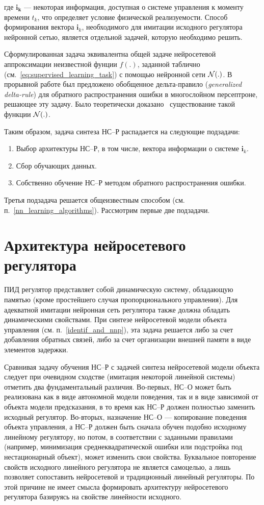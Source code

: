 \noindent где $\mathbf{i_k}$ --- некоторая информация, доступная о
системе управления к моменту времени $t_k$, что определяет условие
физической реализуемости.  Способ формирования вектора $\mathbf{i}_k$,
необходимого для имитации исходного регулятора нейронной сетью,
является отдельной задачей, которую необходимо решить.

Сформулированная задача эквивалентна общей задаче нейросетевой
аппроксимации неизвестной фунции $f(.)$, заданной таблично
(см.~\eqref{eq:supervised_learning_task}) с помощью нейронной сети
$\mathcal{N}(.)$.  В прорывной работе \cite{rumelhart86} был предложено
обобщенное дельта-правило ({\em generalized delta-rule}) для обратного
распространения ошибки в многослойном персептроне, решающее эту
задачу.  Было теоретически доказано~\cite{XXX}
существование такой функции $\mathcal{N}(.)$.

Таким образом, задача синтеза НС--Р распадается на следующие
подзадачи:
\begin{enumerate}
\item Выбор архитектуры НС--Р, в том числе, вектора информации о
  системе $\mathbf{i}_k$.
\item Сбор обучающих данных.
\item Собственно обучение НС--Р методом обратного распространения
  ошибки.
\end{enumerate}

Третья подзадача решается общеизвестным способом
(см. п.~\ref{nn_learning_algorithms}).  Рассмотрим первые две
подзадачи.

\section{Архитектура нейросетевого регулятора}

ПИД регулятор представляет собой динамическую систему, обладающую
памятью (кроме простейшего случая пропорционального управления).  Для
адекватной имитации нейронная сеть регулятора также должна обладать
динамическими свойствами.  При синтезе нейросетевой модели объекта
управления (см. п.~\ref{identif_and_nnp}), эта задача решается либо за
счет добавления обратных связей, либо за счет организации внешней
памяти в виде элементов задержки.

Сравнивая задачу обучения НС--Р с задачей синтеза нейросетевой модели
объекта следует при очевидном сходстве (имитация некоторой линейной
системы) отметить два фундаментальный различия.  Во-первых, НС--О
может быть реализована как в виде автономной модели поведения, так и в
виде зависимой от объекта модели предсказания, в то время как НС--Р
должен полностью заменить исходный регулятор.  Во-вторых, назначение
НС--О --- копирование поведения объекта управления, а НС--Р должен
быть сначала обучен подобно исходному линейному регулятору, но потом,
в соответствии с заданными правилами (например, минимизация
среднеквадратической ошибки или подстройка под нестационарный объект),
может изменить свои свойства.  Буквальное повторение свойств исходного
линейного регулятора не является самоцелью, а лишь позволяет
сопоставить нейросетевой и традиционный линейный регуляторы.  По этой
причине не имеет смысла формировать архитектуру нейросетевого
регулятора базируясь на свойстве линейности исходного.

